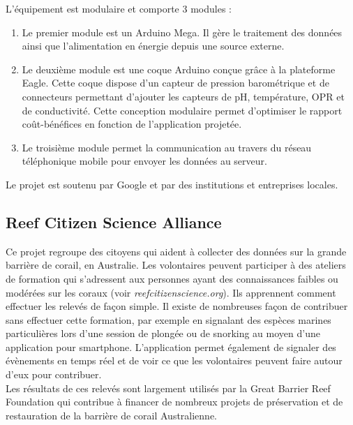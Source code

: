 \documentclass[10pt, article]{llncs}
\begin{document}
		L'équipement est modulaire et comporte 3 modules :\\
		\begin{enumerate}
			\item Le premier module est un Arduino Mega. Il gère le traitement des données ainsi que l'alimentation en énergie depuis une source externe.
			\item Le deuxième module est une coque Arduino conçue grâce à la plateforme Eagle. Cette coque dispose d'un capteur de pression barométrique et de connecteurs permettant d'ajouter les capteurs de pH, température, OPR et de conductivité. Cette conception modulaire permet d'optimiser le rapport coût-bénéfices en fonction de l'application projetée.
			\item Le troisième module permet la communication au travers du réseau téléphonique mobile pour envoyer les données au serveur.
		\end{enumerate}
		Le projet est soutenu par Google et par des institutions et entreprises locales.

	\subsection{Reef Citizen Science Alliance}
		Ce projet regroupe des citoyens qui aident à collecter des données sur la grande barrière de corail, en Australie. Les volontaires peuvent participer à des ateliers de formation qui s'adressent aux personnes ayant des connaissances faibles ou modérées sur les coraux (voir \textit{reefcitizenscience.org}). Ils apprennent comment effectuer les relevés de façon simple. Il existe de nombreuses façon de contribuer sans effectuer cette formation, par exemple en signalant des espèces marines particulières lors d'une session de plongée ou de snorking au moyen d'une application pour smartphone. L'application permet également de signaler des évènements en temps réel et de voir ce que les volontaires peuvent faire autour d'eux pour contribuer. \\
		Les résultats de ces relevés sont largement utilisés par la Great Barrier Reef Foundation qui contribue à financer de nombreux projets de préservation et de  restauration de la barrière de corail Australienne.
	
\end{document}
